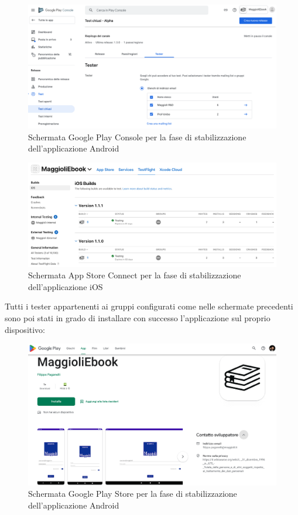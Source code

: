 \begin{figure}[H]
    \centering
    \includegraphics[width=1\textwidth]{img/google-play-console-maggioliebook.png}
    \caption{Schermata Google Play Console per la fase di stabilizzazione dell'applicazione Android}
    \label{google-play-console-maggioliebook}
\end{figure}

\begin{figure}[H]
    \centering
    \includegraphics[width=1\textwidth]{img/app-store-connect-maggioliebook.png}
    \caption{Schermata App Store Connect per la fase di stabilizzazione dell'applicazione iOS}
    \label{app-store-connect-maggioliebook}
\end{figure}

Tutti i tester appartenenti ai gruppi configurati come nelle schermate precedenti sono poi stati in grado di installare con successo l'applicazione sul proprio dispositivo:

\begin{figure}[H]
    \centering
    \includegraphics[width=1\textwidth]{img/google-play-store-maggioliebook.png}
    \caption{Schermata Google Play Store per la fase di stabilizzazione dell'applicazione Android}
    \label{google-play-store-maggioliebook}
\end{figure}

